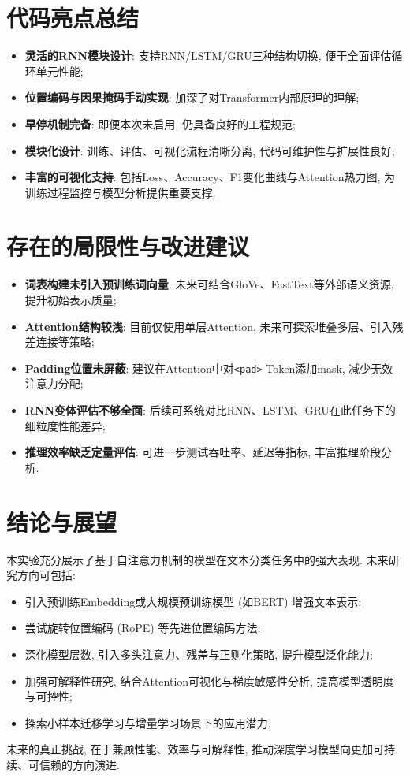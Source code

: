 \documentclass[11pt]{article}
\begin{document}
\section{代码亮点总结}
\begin{itemize}
	\item \textbf{灵活的RNN模块设计}: 支持RNN/LSTM/GRU三种结构切换, 便于全面评估循环单元性能;
	\item \textbf{位置编码与因果掩码手动实现}: 加深了对Transformer内部原理的理解;
	\item \textbf{早停机制完备}: 即便本次未启用, 仍具备良好的工程规范;
	\item \textbf{模块化设计}: 训练、评估、可视化流程清晰分离, 代码可维护性与扩展性良好;
	\item \textbf{丰富的可视化支持}: 包括Loss、Accuracy、F1变化曲线与Attention热力图, 为训练过程监控与模型分析提供重要支撑.
\end{itemize}

\section{存在的局限性与改进建议}
\begin{itemize}
	\item \textbf{词表构建未引入预训练词向量}: 未来可结合GloVe、FastText等外部语义资源, 提升初始表示质量;
	\item \textbf{Attention结构较浅}: 目前仅使用单层Attention, 未来可探索堆叠多层、引入残差连接等策略;
	\item \textbf{Padding位置未屏蔽}: 建议在Attention中对\texttt{<pad>} Token添加mask, 减少无效注意力分配;
	\item \textbf{RNN变体评估不够全面}: 后续可系统对比RNN、LSTM、GRU在此任务下的细粒度性能差异;
	\item \textbf{推理效率缺乏定量评估}: 可进一步测试吞吐率、延迟等指标, 丰富推理阶段分析.
\end{itemize}

\section{结论与展望}
本实验充分展示了基于自注意力机制的模型在文本分类任务中的强大表现. 未来研究方向可包括:
\begin{itemize}
	\item 引入预训练Embedding或大规模预训练模型 (如BERT) 增强文本表示;
	\item 尝试旋转位置编码 (RoPE) 等先进位置编码方法;
	\item 深化模型层数, 引入多头注意力、残差与正则化策略, 提升模型泛化能力;
	\item 加强可解释性研究, 结合Attention可视化与梯度敏感性分析, 提高模型透明度与可控性;
	\item 探索小样本迁移学习与增量学习场景下的应用潜力.
\end{itemize}

未来的真正挑战, 在于兼顾性能、效率与可解释性, 推动深度学习模型向更加可持续、可信赖的方向演进.
\end{document}

